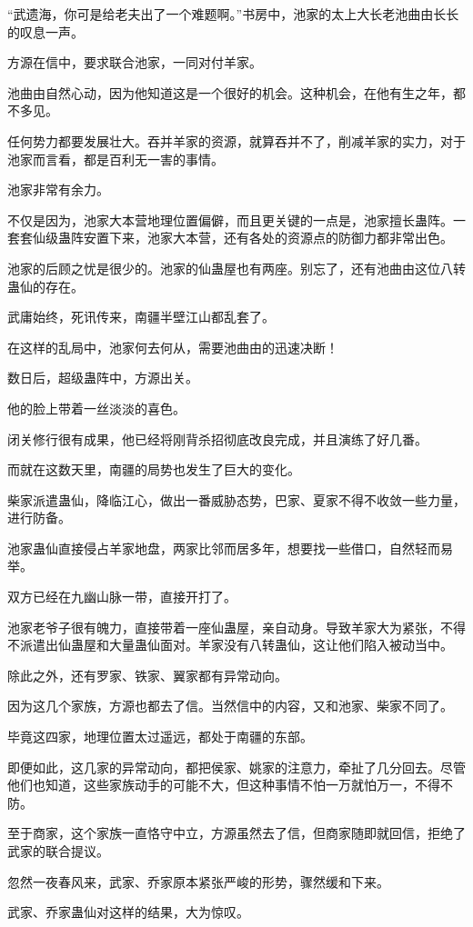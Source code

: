 \begin{this_body}
“武遗海，你可是给老夫出了一个难题啊。”书房中，池家的太上大长老池曲由长长的叹息一声。

方源在信中，要求联合池家，一同对付羊家。

池曲由自然心动，因为他知道这是一个很好的机会。这种机会，在他有生之年，都不多见。

任何势力都要发展壮大。吞并羊家的资源，就算吞并不了，削减羊家的实力，对于池家而言看，都是百利无一害的事情。

池家非常有余力。

不仅是因为，池家大本营地理位置偏僻，而且更关键的一点是，池家擅长蛊阵。一套套仙级蛊阵安置下来，池家大本营，还有各处的资源点的防御力都非常出色。

池家的后顾之忧是很少的。池家的仙蛊屋也有两座。别忘了，还有池曲由这位八转蛊仙的存在。

武庸始终，死讯传来，南疆半壁江山都乱套了。

在这样的乱局中，池家何去何从，需要池曲由的迅速决断！

数日后，超级蛊阵中，方源出关。

他的脸上带着一丝淡淡的喜色。

闭关修行很有成果，他已经将刚背杀招彻底改良完成，并且演练了好几番。

而就在这数天里，南疆的局势也发生了巨大的变化。

柴家派遣蛊仙，降临江心，做出一番威胁态势，巴家、夏家不得不收敛一些力量，进行防备。

池家蛊仙直接侵占羊家地盘，两家比邻而居多年，想要找一些借口，自然轻而易举。

双方已经在九幽山脉一带，直接开打了。

池家老爷子很有魄力，直接带着一座仙蛊屋，亲自动身。导致羊家大为紧张，不得不派遣出仙蛊屋和大量蛊仙面对。羊家没有八转蛊仙，这让他们陷入被动当中。

除此之外，还有罗家、铁家、翼家都有异常动向。

因为这几个家族，方源也都去了信。当然信中的内容，又和池家、柴家不同了。

毕竟这四家，地理位置太过遥远，都处于南疆的东部。

即便如此，这几家的异常动向，都把侯家、姚家的注意力，牵扯了几分回去。尽管他们也知道，这些家族动手的可能不大，但这种事情不怕一万就怕万一，不得不防。

至于商家，这个家族一直恪守中立，方源虽然去了信，但商家随即就回信，拒绝了武家的联合提议。

忽然一夜春风来，武家、乔家原本紧张严峻的形势，骤然缓和下来。

武家、乔家蛊仙对这样的结果，大为惊叹。


\end{this_body}
